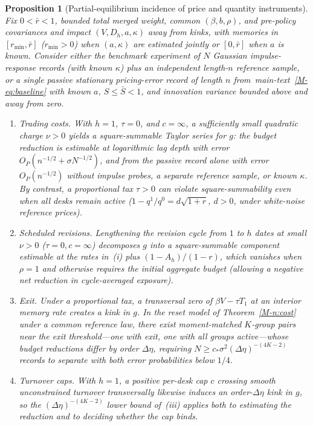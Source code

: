 \documentclass[12pt]{article}
\newtheorem{proposition}[theorem]{Proposition}
\theoremstyle{definition}
\theoremstyle{remark}
\begin{document}
\begin{proposition}[Partial-equilibrium incidence of price and quantity instruments]\label{thm:instruments}\label{prop:instrument_bound}
Fix $0 < \bar{r} < 1$, bounded total merged weight, common $(\beta, b, \rho)$, and pre-policy covariances and impact $(V, D_h, a, \kappa)$ away from kinks, with memories in $[r_{\min}, \bar{r}]$ ($r_{\min} > 0$) when $(a, \kappa)$ are estimated jointly or $[0, \bar{r}]$ when $a$ is known. Consider either the benchmark experiment of $N$ Gaussian impulse-response records (with known $\kappa$) plus an independent length-$n$ reference sample, or a single passive stationary pricing-error record of length $n$ from~main-text~\eqref{M-eq:baseline} with known $a$, $S \le \bar{S} < 1$, and innovation variance bounded above and away from zero.
\begin{enumerate}
\item[(i)] \emph{Trading costs.} With $h=1$, $\tau=0$, and $c=\infty$, a sufficiently small quadratic charge $\nu > 0$ yields a square-summable Taylor series for $g$: the budget reduction is estimable at logarithmic lag depth with error $O_P(n^{-1/2}+\sigma N^{-1/2})$, and from the passive record alone with error $O_P(n^{-1/2})$ without impulse probes, a separate reference sample, or known $\kappa$. By contrast, a proportional tax $\tau > 0$ can violate square-summability even when all desks remain active ($1-q^1/q^0=d\sqrt{1+r}$, $d > 0$, under white-noise reference prices).
\item[(ii)] \emph{Scheduled revisions.} Lengthening the revision cycle from $1$ to $h$ dates at small $\nu > 0$ ($\tau=0, c=\infty$) decomposes $g$ into a square-summable component estimable at the rates in~(i) plus $(1-A_h)/(1-r)$, which vanishes when $\rho=1$ and otherwise requires the initial aggregate budget (allowing a negative net reduction in cycle-averaged exposure).
\item[(iii)] \emph{Exit.} Under a proportional tax, a transversal zero of $\beta V-\tau T_1$ at an interior memory rate creates a kink in $g$. In the reset model of Theorem~\ref{M-n:cost} under a common reference law, there exist moment-matched $K$-group pairs near the exit threshold---one with exit, one with all groups active---whose budget reductions differ by order $\Delta\eta$, requiring $N\ge c_*\sigma^2(\Delta\eta)^{-(4K-2)}$ records to separate with both error probabilities below $1/4$.
\item[(iv)] \emph{Turnover caps.} With $h = 1$, a positive per-desk cap $c$ crossing smooth unconstrained turnover transversally likewise induces an order-$\Delta\eta$ kink in $g$, so the $(\Delta\eta)^{-(4K-2)}$ lower bound of~(iii) applies both to estimating the reduction and to deciding whether the cap binds.
\end{enumerate}
\end{proposition}
\end{document}
